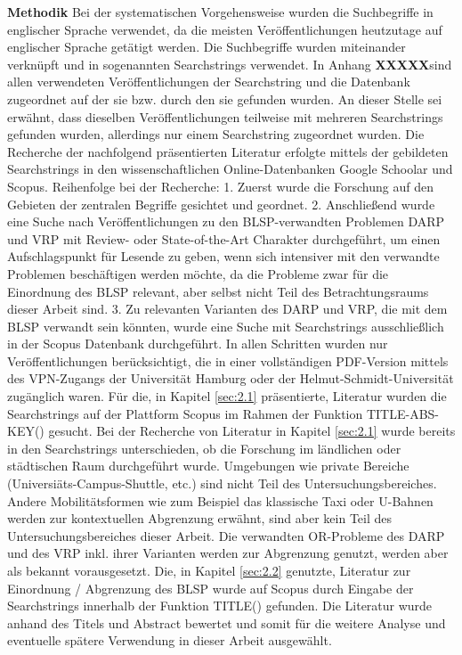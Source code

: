 \textbf{Methodik} Bei der systematischen Vorgehensweise wurden die Suchbegriffe in englischer Sprache verwendet, da die meisten Veröffentlichungen heutzutage auf englischer Sprache getätigt werden. Die Suchbegriffe wurden miteinander verknüpft und in sogenannten Searchstrings verwendet. In Anhang \textbf{XXXXX}sind allen verwendeten Veröffentlichungen der Searchstring und die Datenbank zugeordnet auf der sie bzw. durch den sie gefunden wurden. An dieser Stelle sei erwähnt, dass dieselben Veröffentlichungen teilweise mit mehreren Searchstrings gefunden wurden, allerdings nur einem Searchstring zugeordnet wurden. Die Recherche der nachfolgend präsentierten Literatur erfolgte mittels der gebildeten Searchstrings in den wissenschaftlichen Online-Datenbanken Google Schoolar und Scopus. Reihenfolge bei der Recherche: 1. Zuerst wurde die Forschung auf den Gebieten der zentralen Begriffe gesichtet und geordnet. 2. Anschließend wurde eine Suche nach Veröffentlichungen zu den BLSP-verwandten Problemen DARP und VRP mit Review- oder State-of-the-Art Charakter durchgeführt, um einen Aufschlagspunkt für Lesende zu geben, wenn sich intensiver mit den verwandte Problemen beschäftigen werden möchte, da die Probleme zwar für die Einordnung des BLSP relevant, aber selbst nicht Teil des Betrachtungsraums dieser Arbeit sind. 3. Zu relevanten Varianten des DARP und VRP, die mit dem BLSP verwandt sein könnten, wurde eine Suche mit Searchstrings ausschließlich in der Scopus Datenbank durchgeführt. In allen Schritten wurden nur Veröffentlichungen berücksichtigt, die in einer vollständigen PDF-Version mittels des VPN-Zugangs der Universität Hamburg oder der Helmut-Schmidt-Universität zugänglich waren. Für die, in Kapitel \ref{sec:2.1} präsentierte, Literatur wurden die Searchstrings auf der Plattform Scopus im Rahmen der Funktion \glqq TITLE-ABS-KEY()\grqq{} gesucht. Bei der Recherche von Literatur in Kapitel \ref{sec:2.1} wurde bereits in den Searchstrings unterschieden, ob die Forschung im ländlichen oder städtischen Raum durchgeführt wurde. Umgebungen wie private Bereiche (Universiäts-Campus-Shuttle, etc.) sind nicht Teil des Untersuchungsbereiches. Andere Mobilitätsformen wie zum Beispiel das klassische Taxi oder U-Bahnen werden zur kontextuellen Abgrenzung erwähnt, sind aber kein Teil des Untersuchungsbereiches dieser Arbeit. Die verwandten OR-Probleme des DARP und des VRP inkl. ihrer Varianten werden zur Abgrenzung genutzt, werden aber als bekannt vorausgesetzt. Die, in Kapitel \ref{sec:2.2} genutzte, Literatur zur Einordnung / Abgrenzung des BLSP wurde auf Scopus durch Eingabe der Searchstrings innerhalb der Funktion \glqq TITLE()\grqq{} gefunden. Die Literatur wurde anhand des Titels und Abstract bewertet und somit für die weitere Analyse und eventuelle spätere Verwendung in dieser Arbeit ausgewählt. 

